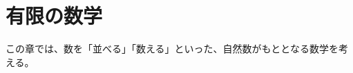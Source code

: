 \documentclass[../math-imaging]{subfiles}
\begin{document}
\chapter{有限の数学}

この章では、数を「並べる」「数える」といった、自然数がもととなる数学を考える。



\end{document}
